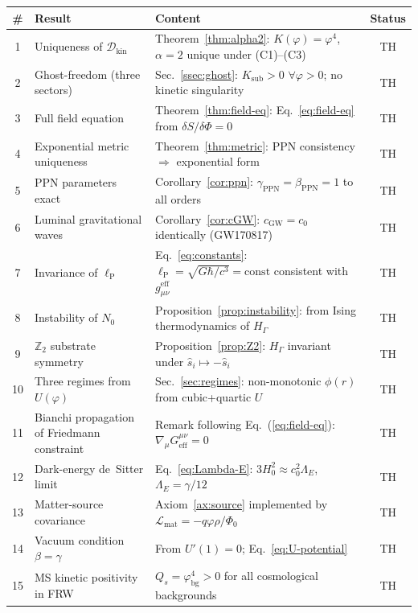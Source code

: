 \documentclass[11pt,a4paper]{article}
\renewcommand{\Phi}{\varPhi}
\newcommand{\PhiZero}{\varPhi_{0}}
\newcommand{\Nzero}{N_{0}}
\newcommand{\lP}{\ell_{\mathrm{P}}}
\newcommand{\Zp}{\mathbb{Z}_{2}}
\newcommand{\DD}{\mathcal{D}}
\begin{document}
\begin{center}\small
\begin{longtable}{@{}clp{7.2cm}c@{}}
\toprule
\# & \textbf{Result} & \textbf{Content} & \textbf{Status}\\
\midrule
\endhead
1 & Uniqueness of $\DD_{\mathrm{kin}}$
  & Theorem~\ref{thm:alpha2}: $K(\varphi)=\varphi^{4}$, $\alpha=2$ unique under (C1)--(C3)
  & \textsf{TH}\\
2 & Ghost-freedom (three sectors)
  & Sec.~\ref{ssec:ghost}: $K_{\mathrm{sub}}>0$ $\forall\varphi>0$; no kinetic singularity
  & \textsf{TH}\\
3 & Full field equation
  & Theorem~\ref{thm:field-eq}: Eq.~\eqref{eq:field-eq} from $\delta S/\delta\Phi=0$
  & \textsf{TH}\\
4 & Exponential metric uniqueness
  & Theorem~\ref{thm:metric}: PPN consistency $\Rightarrow$ exponential form
  & \textsf{TH}\\
5 & PPN parameters exact
  & Corollary~\ref{cor:ppn}: $\gamma_{\mathrm{PPN}}=\beta_{\mathrm{PPN}}=1$ to all orders
  & \textsf{TH}\\
6 & Luminal gravitational waves
  & Corollary~\ref{cor:cGW}: $c_{\mathrm{GW}}=c_{0}$ identically (GW170817)
  & \textsf{TH}\\
7 & Invariance of $\lP$
  & Eq.~\eqref{eq:constants}: $\lP=\sqrt{G\hbar/c^{3}}=\mathrm{const}$ consistent with $g_{\mu\nu}^{\mathrm{eff}}$
  & \textsf{TH}\\
8 & Instability of $\Nzero$
  & Proposition~\ref{prop:instability}: from Ising thermodynamics of $H_{\Gamma}$
  & \textsf{TH}\\
9 & $\Zp$ substrate symmetry
  & Proposition~\ref{prop:Z2}: $H_{\Gamma}$ invariant under $\hat{s}_{i}\mapsto-\hat{s}_{i}$
  & \textsf{TH}\\
10 & Three regimes from $U(\varphi)$
  & Sec.~\ref{sec:regimes}: non-monotonic $\phi(r)$ from cubic+quartic $U$
  & \textsf{TH}\\
11 & Bianchi propagation of Friedmann constraint
  & Remark following Eq.~(\ref{eq:field-eq}): $\nabla_{\mu}G_{\mathrm{eff}}^{\mu\nu}=0$
  & \textsf{TH}\\
12 & Dark-energy de~Sitter limit
  & Eq.~\eqref{eq:Lambda-E}: $3H_{0}^{2}\approx c_{0}^{2}\Lambda_{E}$, $\Lambda_{E}=\gamma/12$
  & \textsf{TH}\\
13 & Matter-source covariance
  & Axiom~\ref{ax:source} implemented by $\mathcal{L}_{\mathrm{mat}}=-q\varphi\rho/\PhiZero$
  & \textsf{TH}\\
14 & Vacuum condition $\beta=\gamma$
  & From $U'(1)=0$; Eq.~\eqref{eq:U-potential}
  & \textsf{TH}\\
15 & MS kinetic positivity in FRW
  & $Q_{s}=\varphi_{\mathrm{bg}}^{4}>0$ for all cosmological backgrounds
  & \textsf{TH}\\
\bottomrule
\end{longtable}
\end{center}
\end{document}
